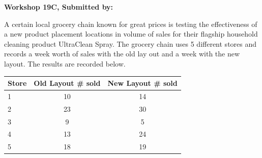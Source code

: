 \documentclass[11pt, chapterprefix=true]{scrbook}\usepackage[]{graphicx}\usepackage[]{color}
\begin{document}
\begin{exercises}
\begin{exercise}
\end{exercise}
\begin{solution}  %

\end{solution}

\clearpage

    \begin{exercise}  %

    \begin{center}
\begin{flushleft}\textbf{\large \hfill Workshop 19C, Submitted by: }\end{flushleft}

\end{center}

A certain local grocery chain known for great prices is testing the effectiveness of a new product placement locations in volume of sales for their flagship household cleaning product UltraClean Spray. The grocery chain uses 5 different stores and records a week worth of sales with the old lay out and a week with the new layout. The results are recorded below.

\begin{center}
\begin{tabular}{@{} lcc @{}} \hline
Store &	Old Layout \# sold &	New Layout \# sold \\ \hline
1&	10&	14 \\
2&	23&	30 \\
3&	9&	5 \\
4&	13&	24 \\
5&	18&	19 \\ \hline
\end{tabular}
\end{center}


\end{exercise}
\end{exercises}
\end{document}
